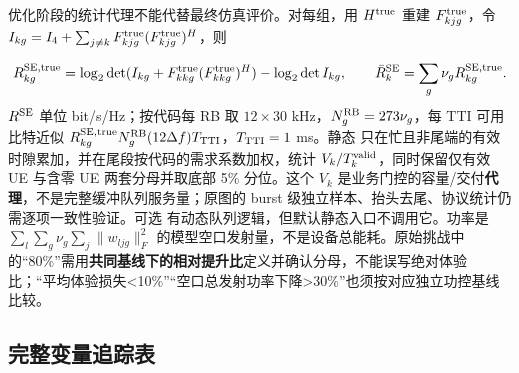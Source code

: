 \documentclass[11pt,a4paper]{ctexart}
\begin{document}
优化阶段的统计代理不能代替最终仿真评价。对每组，用 $H^{\rm true}$ 重建 $F_{kjg}^{\rm true}$，令 $I_{kg}=I_4+\sum_{j\ne k}F_{kjg}^{\rm true}(F_{kjg}^{\rm true})^H$，则\par
\[
R_{kg}^{\rm SE,true}=\log_2\det(I_{kg}+F_{kkg}^{\rm true}(F_{kkg}^{\rm true})^H)-\log_2\det I_{kg},
\qquad \bar R_k^{\rm SE}=\sum_g\nu_gR_{kg}^{\rm SE,true}.
\]
$R^{\rm SE}$ 单位 bit/s/Hz；按代码每 RB 取 $12\times30$ kHz，$N_g^{\rm RB}=273\nu_g$，每 TTI 可用比特近似 $R_{kg}^{\rm SE,true}N_g^{\rm RB}(12\Delta f)T_{\rm TTI}$，$T_{\rm TTI}=1$ ms。静态  只在忙且非尾端的有效时隙累加，并在尾段按代码的需求系数加权，统计 $V_k/T_k^{\rm valid}$，同时保留仅有效 UE 与含零 UE 两套分母并取底部 5\% 分位。这个 $V_k$ 是业务门控的容量/交付\textbf{代理}，不是完整缓冲队列服务量；原图的 burst 级独立样本、抬头去尾、协议统计仍需逐项一致性验证。可选  有动态队列逻辑，但默认静态入口不调用它。功率是 $\sum_l\sum_g\nu_g\sum_j\|w_{ljg}\|_F^2$ 的模型空口发射量，不是设备总能耗。原始挑战中的“80\%”需用\textbf{共同基线下的相对提升比}定义并确认分母，不能误写绝对体验比；“平均体验损失<10\%”“空口总发射功率下降>30\%”也须按对应独立功控基线比较。\par

\subsection*{完整变量追踪表}
\end{document}

